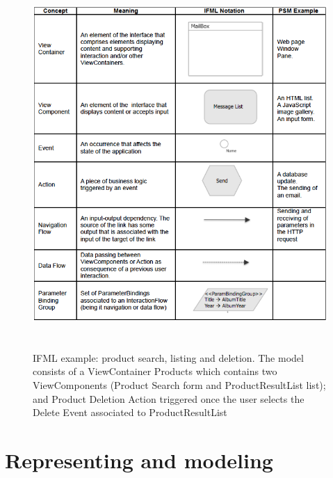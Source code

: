 \vspace{0.5cm}
\begin{figure}[htbp]
  \centering
    \includegraphics[height=14cm]{images/ifml.jpg}
  \caption{IFML example: product search, listing and deletion. The model consists of a ViewContainer Products which contains two ViewComponents (Product Search form and ProductResultList list); and Product Deletion Action triggered once the user selects the Delete Event associated to ProductResultList}
  \label{fig:ifml}
\end{figure}
\vspace{0.5cm}

\section{Representing and modeling}

